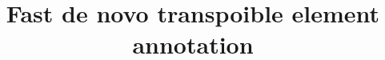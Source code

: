 \documentclass{bmcart}
\begin{document}
\begin{frontmatter}

\begin{fmbox}


\title{Fast de novo transpoible element annotation}


\author[
   addressref={aff1},                   %
   noteref={n1},                        %
   email={figuernd@miamiOH.edu}   %
]{ }
\author[
   addressref={aff1},
   email={schaefce@miamiOH.edu}
]{ }
\author[
   addressref={aff1,aff2},
   email={liux17@miamiOH.edu}
]{ }
\author[
  addressref={aff1,aff2,aff3,aff4},
  corref={aff1},
  noteref={n2},
  email={karroje@miamiOH.edu}
]{ }



\end{fmbox}
\end{frontmatter}
\end{document}
